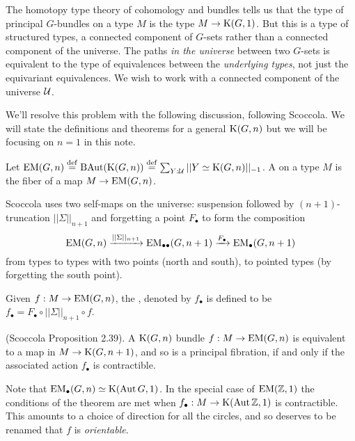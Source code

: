 The homotopy type theory of cohomology and bundles tells us that the type of principal \( G \)-bundles on a type \( M \) is the type \( M\to\mathrm{K}(G,1) \). But this is a type of structured types, a connected component of \( G \)-sets rather than a connected component of the universe. The paths \emph{in the universe} between two \( G \)-sets is equivalent to the type of equivalences between the \emph{underlying types}, not just the equivariant equivalences. We wish to work with a connected component of the universe \( \mathcal{U} \).

We'll resolve this problem with the following discussion, following Scoccola\cite{sco}. We will state the definitions and theorems for a general \( \mathrm{K}(G,n) \) but we will be focusing on \( n=1 \) in this note.

\begin{mydef}
Let \( \mathrm{EM}(G,n)\stackrel{\mathrm{def}}{=} \operatorname{BAut}(\mathrm{K}(G,n))\stackrel{\mathrm{def}}{=} \sum_{Y:\mathcal{U}}||Y\simeq \mathrm{K}(G,n)||_{-1}\). A  on a type \( M \) is the fiber of a map \( M\to\mathrm{EM}(G,n) \).
\end{mydef}

Scoccola uses two self-maps on the universe: suspension followed by \( (n+1) \)-truncation \( ||\Sigma||_{n+1} \) and forgetting a point \( F_\bullet \) to form the composition 
\[ 
\mathrm{EM}(G,n)\xrightarrow[]{||\Sigma||_{n+1}} \mathrm{EM}_{\bullet\bullet}(G,n+1)\xrightarrow[]{F_\bullet}\mathrm{EM_{\bullet}}(G,n+1)
\]
from types to types with two points (north and south), to pointed types (by forgetting the south point).

\begin{mydef}
Given \( f:M\to\mathrm{EM}(G,n) \), the , denoted by \( f_\bullet \) is defined to be \( f_\bullet=F_\bullet\circ||\Sigma||_{n+1}\circ f \).
\end{mydef}

\begin{mythm}
(Scoccola\cite{sco} Proposition 2.39). A \( \mathrm{K}(G,n) \) bundle \( f:M\to\mathrm{EM}(G,n) \) is equivalent to a map in \( M\to\mathrm{K}(G,n+1) \), and so is a principal fibration, if and only if the associated action \( f_\bullet \) is contractible.
\end{mythm}

Note that \( \mathrm{EM_{\bullet}}(G,n)\simeq \mathrm{K}(\operatorname{Aut} G,1) \). In the special case of \( \mathrm{EM}(\mathbb{Z},1) \) the conditions of the theorem are met when \( f_\bullet:M\to\mathrm{K}(\operatorname{Aut} \mathbb{Z}, 1) \) is contractible. This amounts to a choice of direction for all the circles, and so deserves to be renamed that \( f \) is \emph{orientable}.

